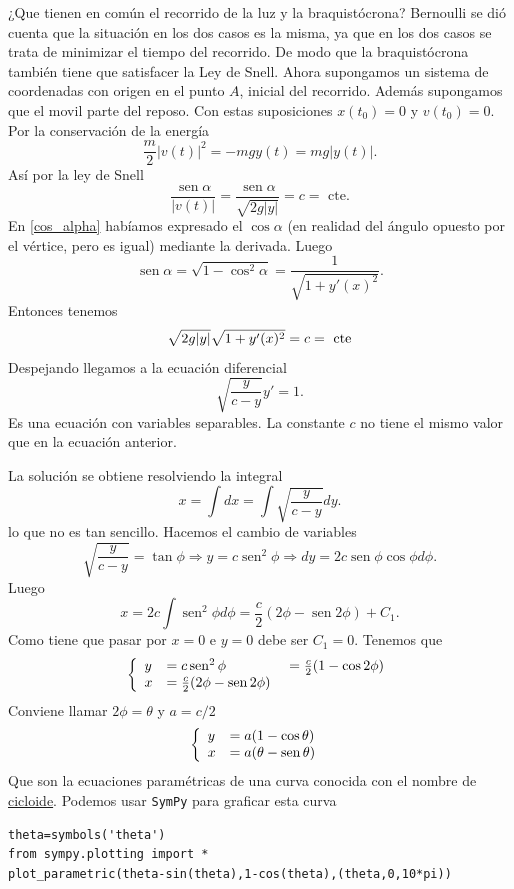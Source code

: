 \documentclass{article}
\DeclareMathOperator{\sen}{sen}
\begin{document}
¿Que tienen en común el recorrido de la luz y la braquistócrona? Bernoulli se dió cuenta que la situación en los dos casos es la misma, ya que en los dos casos
se trata de minimizar el tiempo del recorrido. De modo que la braquistócrona también tiene que satisfacer la Ley de Snell.
 Ahora supongamos un sistema de coordenadas con origen en el punto $A$, inicial del recorrido.  Además supongamos que el movil  parte
del reposo. Con estas suposiciones $x(t_0)=0$ y $v(t_0)=0$. Por la conservación de la energía 
\[\frac{m}{2}|v(t)|^2=-mgy(t)=mg|y(t)|.\]
 Así por la ley de Snell
\[\frac{\sen\alpha}{|v(t)|}=\frac{\sen\alpha}{\sqrt{2g|y|}}=c=\text{ cte}.\]
En \eqref{cos_alpha} habíamos expresado el $\cos\alpha$ (en realidad del ángulo opuesto por el vértice, pero es igual) mediante la derivada. Luego
\[\sen\alpha=\sqrt{1-\cos^2\alpha}=\frac{1}{\sqrt{1+y'(x)^2}}.\]
Entonces tenemos
\[\sqrt{2g|y|}\sqrt{1+y'(x)^2}=c=\hbox{ cte}\]
Despejando llegamos a la ecuación diferencial
\[\boxed{\sqrt{\frac{y}{c-y}}y'=1}.\]
Es una ecuación con variables separables. La constante $c$ no tiene el mismo valor que en la ecuación anterior.  

La solución se obtiene resolviendo la integral
\[x=\int dx=\int \sqrt{\frac{y}{c-y}}dy.\]
lo que no es tan sencillo. Hacemos el cambio de variables
\[\sqrt{\frac{y}{c-y}}=\tan\phi\Longrightarrow y=c\sen^2\phi\Longrightarrow dy=2c\sen\phi\cos\phi d\phi.\]
Luego
\[x=2c\int\sen^2\phi d\phi=\frac{c}{2}\left(2\phi-\sen 2\phi\right)+C_1.\]
Como tiene que pasar por $x=0$ e $y=0$ debe ser $C_1=0$.  Tenemos que
 \[\left\{\begin{array}{l l l}
	      y&=c\sen^2 \phi&=\frac{c}{2}(1-\cos2\phi)\\
	      x&=\frac{c}{2}(2\phi-\sen2\phi)\ &\\
          \end{array}\right.
\]
Conviene llamar $2\phi=\theta$ y $a=c/2$
 \[\left\{\begin{array}{l l }
	      y&= a(1-\cos\theta)\\
	      x&=a(\theta-\sen\theta)\
          \end{array}\right.
\]
Que son la ecuaciones paramétricas de una curva conocida con el nombre de \href{http://es.wikipedia.org/wiki/Cicloide}{cicloide}. Podemos usar \texttt{SymPy} para graficar esta curva
\begin{lstlisting}
theta=symbols('theta')
from sympy.plotting import *
plot_parametric(theta-sin(theta),1-cos(theta),(theta,0,10*pi))
\end{lstlisting}
\end{document}
